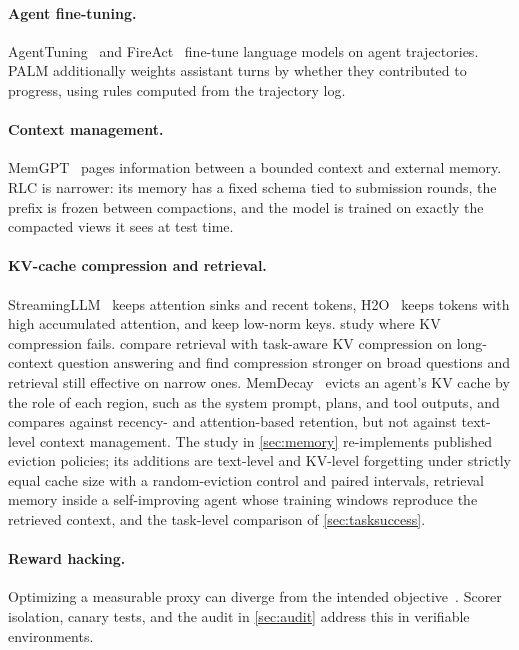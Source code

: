 \documentclass[11pt]{article}
\begin{document}
\paragraph{Agent fine-tuning.}
AgentTuning~\citep{zeng2023agenttuning} and FireAct~\citep{chen2023fireact} fine-tune language models on agent trajectories. PALM additionally weights assistant turns by whether they contributed to progress, using rules computed from the trajectory log.

\paragraph{Context management.}
MemGPT~\citep{packer2023memgpt} pages information between a bounded context and external memory. RLC is narrower: its memory has a fixed schema tied to submission rounds, the prefix is frozen between compactions, and the model is trained on exactly the compacted views it sees at test time.

\paragraph{KV-cache compression and retrieval.}
StreamingLLM~\citep{xiao2024streamingllm} keeps attention sinks and recent tokens, H2O~\citep{zhang2023h2o} keeps tokens with high accumulated attention, and \citet{devoto2024l2norm} keep low-norm keys. \citet{chen2026pitfalls} study where KV compression fails. \citet{corallo2025beyondrag} compare retrieval with task-aware KV compression on long-context question answering and find compression stronger on broad questions and retrieval still effective on narrow ones. MemDecay~\citep{matam2026memdecay} evicts an agent's KV cache by the role of each region, such as the system prompt, plans, and tool outputs, and compares against recency- and attention-based retention, but not against text-level context management. The study in \cref{sec:memory} re-implements published eviction policies; its additions are text-level and KV-level forgetting under strictly equal cache size with a random-eviction control and paired intervals, retrieval memory inside a self-improving agent whose training windows reproduce the retrieved context, and the task-level comparison of \cref{sec:tasksuccess}.

\paragraph{Reward hacking.}
Optimizing a measurable proxy can diverge from the intended objective~\citep{skalse2022rewardhacking}. Scorer isolation, canary tests, and the audit in \cref{sec:audit} address this in verifiable environments.
\end{document}
